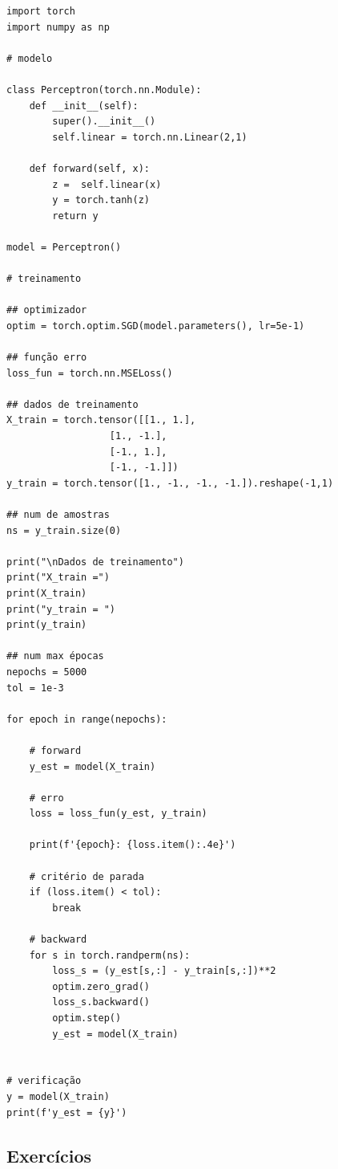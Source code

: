 % 
\begin{lstlisting}[caption=perceptron\_sgd.py, label=cap_perceptron_sec_train:cod:perceptron_sgd]
import torch
import numpy as np

# modelo

class Perceptron(torch.nn.Module):
    def __init__(self):
        super().__init__()
        self.linear = torch.nn.Linear(2,1)

    def forward(self, x):
        z =  self.linear(x)
        y = torch.tanh(z)
        return y

model = Perceptron()

# treinamento

## optimizador
optim = torch.optim.SGD(model.parameters(), lr=5e-1)

## função erro
loss_fun = torch.nn.MSELoss()

## dados de treinamento
X_train = torch.tensor([[1., 1.],
                  [1., -1.],
                  [-1., 1.],
                  [-1., -1.]])
y_train = torch.tensor([1., -1., -1., -1.]).reshape(-1,1)

## num de amostras
ns = y_train.size(0)

print("\nDados de treinamento")
print("X_train =")
print(X_train)
print("y_train = ")
print(y_train)

## num max épocas
nepochs = 5000
tol = 1e-3

for epoch in range(nepochs):

    # forward
    y_est = model(X_train)

    # erro
    loss = loss_fun(y_est, y_train)

    print(f'{epoch}: {loss.item():.4e}')

    # critério de parada
    if (loss.item() < tol):
        break

    # backward
    for s in torch.randperm(ns):
        loss_s = (y_est[s,:] - y_train[s,:])**2
        optim.zero_grad()
        loss_s.backward()
        optim.step()
        y_est = model(X_train)


# verificação
y = model(X_train)
print(f'y_est = {y}')
\end{lstlisting}


\subsection{Exercícios}

